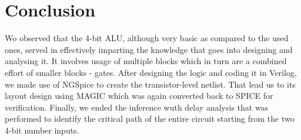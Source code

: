 \documentclass[a4paper, titlepage]{article}
\begin{document}
\section{Conclusion}
Wo observed that the 4-bit ALU, although very basic as compared to the used ones, served in effectively imparting the 
knowledge that goes into designing and analysing it. It involves usage of multiple blocks which in turn are a combined 
effort of smaller blocks - gates. After designing the logic and coding it in Verilog, we made use of NGSpice to
create the transistor-level netlist. That lead us to its layout design using MAGIC which was again converted back to SPICE
for verification. Finally, we ended the inference wuth delay analysis that was performed to identify the critical path of
the entire circuit starting from the two 4-bit number inputs.
\end{document}
